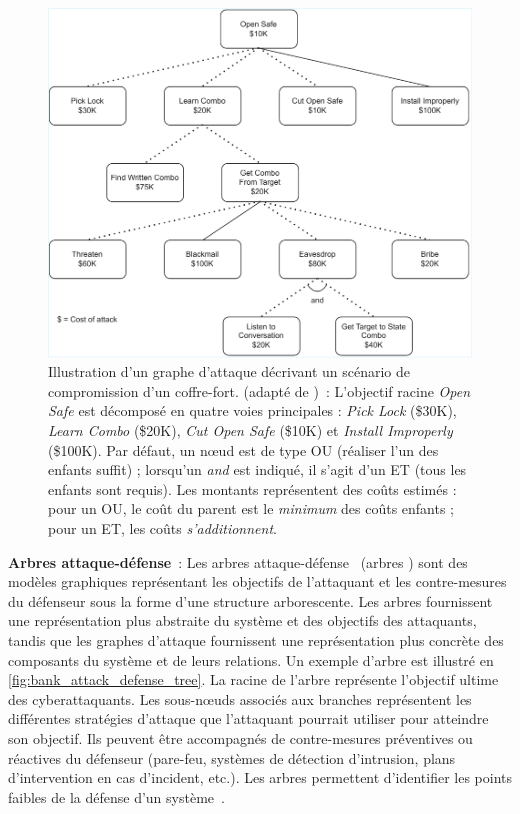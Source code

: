 \begin{figure}[h]
  \centering
  \includegraphics[width=0.8\linewidth]{figures/attack_graph.pdf}
  \caption[Illustration d'un graphe d'attaque décrivant un scénario de compromission d’un coffre-fort.]{Illustration d'un graphe d'attaque décrivant un scénario de compromission d’un coffre-fort. (adapté de \cite{schneier1999modeling})~: L’objectif racine \emph{Open Safe} est décomposé en quatre voies principales : \emph{Pick Lock} (\$30K), \emph{Learn Combo} (\$20K), \emph{Cut Open Safe} (\$10K) et \emph{Install Improperly} (\$100K). Par défaut, un nœud est de type \textsc{OU} (réaliser l’un des enfants suffit) ; lorsqu’un \emph{and} est indiqué, il s’agit d’un \textsc{ET} (tous les enfants sont requis). Les montants représentent des coûts estimés : pour un \textsc{OU}, le coût du parent est le \emph{minimum} des coûts enfants ; pour un \textsc{ET}, les coûts \emph{s’additionnent}.}
  \label{fig:attack_graphs}
\end{figure}

\noindent
\textbf{Arbres attaque-défense}~: \quad Les arbres attaque-défense~\cite{BKordy2010} (arbres ) sont des modèles graphiques représentant les objectifs de l'attaquant et les contre-mesures du défenseur sous la forme d'une structure arborescente. Les arbres  fournissent une représentation plus abstraite du système et des objectifs des attaquants, tandis que les graphes d'attaque fournissent une représentation plus concrète des composants du système et de leurs relations. Un exemple d'arbre  est illustré en \autoref{fig:bank_attack_defense_tree}. La racine de l'arbre  représente l'objectif ultime des cyberattaquants. Les sous-nœuds associés aux branches représentent les différentes stratégies d'attaque que l'attaquant pourrait utiliser pour atteindre son objectif. Ils peuvent être accompagnés de contre-mesures préventives ou réactives du défenseur (pare-feu, systèmes de détection d'intrusion, plans d'intervention en cas d'incident, etc.).
Les arbres  permettent d'identifier les points faibles de la défense d'un système~\cite{BKordy2010}.

